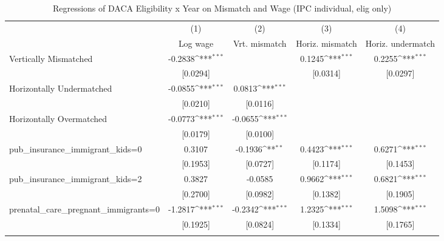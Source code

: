 \begin{table}[htbp]\centering
\def\sym#1{\ifmmode^{#1}\else\(^{#1}\)\fi}
\caption{Regressions of DACA Eligibility x Year on Mismatch and Wage (IPC individual, elig only)}
\begin{tabular}{l*{4}{c}}
\toprule
                    &\multicolumn{1}{c}{(1)}         &\multicolumn{1}{c}{(2)}         &\multicolumn{1}{c}{(3)}         &\multicolumn{1}{c}{(4)}         \\
                    &    Log wage         &Vrt. mismatch         &Horiz. mismatch         &Horiz. undermatch         \\
\midrule
Vertically Mismatched&     -0.2838\sym{***}&                     &      0.1245\sym{***}&      0.2255\sym{***}\\
                    &    [0.0294]         &                     &    [0.0314]         &    [0.0297]         \\
\addlinespace
Horizontally Undermatched&     -0.0855\sym{***}&      0.0813\sym{***}&                     &                     \\
                    &    [0.0210]         &    [0.0116]         &                     &                     \\
\addlinespace
Horizontally Overmatched&     -0.0773\sym{***}&     -0.0655\sym{***}&                     &                     \\
                    &    [0.0179]         &    [0.0100]         &                     &                     \\
\addlinespace
pub\_insurance\_immigrant\_kids=0&      0.3107         &     -0.1936\sym{**} &      0.4423\sym{***}&      0.6271\sym{***}\\
                    &    [0.1953]         &    [0.0727]         &    [0.1174]         &    [0.1453]         \\
\addlinespace
pub\_insurance\_immigrant\_kids=2&      0.3827         &     -0.0585         &      0.9662\sym{***}&      0.6821\sym{***}\\
                    &    [0.2700]         &    [0.0982]         &    [0.1382]         &    [0.1905]         \\
\addlinespace
prenatal\_care\_pregnant\_immigrants=0&     -1.2817\sym{***}&     -0.2342\sym{***}&      1.2325\sym{***}&      1.5098\sym{***}\\
                    &    [0.1925]         &    [0.0824]         &    [0.1334]         &    [0.1765]         \\
\addlinespace

\end{tabular}
\end{table}
